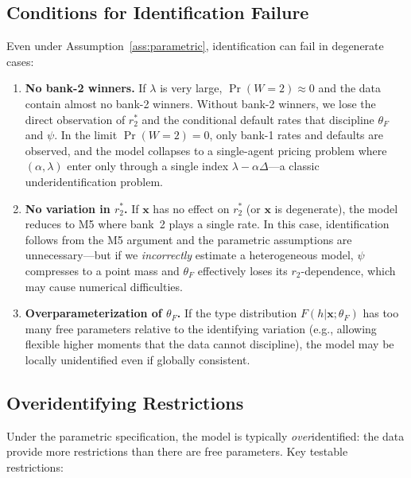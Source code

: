 \documentclass[12pt]{article}
\theoremstyle{plain}
\theoremstyle{plain}
\theoremstyle{definition}  %
\theoremstyle{remark}  %
\begin{document}
\subsection{Conditions for Identification Failure}\label{sec:failure}

Even under Assumption~\ref{ass:parametric}, identification can fail in degenerate cases:

\begin{enumerate}
    \item \textbf{No bank-2 winners.} If $\lambda$ is very large, $\Pr(W\!=\!2) \approx 0$ and the data contain almost no bank-2 winners.  Without bank-2 winners, we lose the direct observation of $r_2^*$ and the conditional default rates that discipline $\theta_F$ and $\psi$.  In the limit $\Pr(W\!=\!2) = 0$, only bank-1 rates and defaults are observed, and the model collapses to a single-agent pricing problem where $(\alpha, \lambda)$ enter only through a single index $\lambda - \alpha\Delta$---a classic underidentification problem.
    
    \item \textbf{No variation in $r_2^*$.} If $\mathbf{x}$ has no effect on $r_2^*$ (or $\mathbf{x}$ is degenerate), the model reduces to M5 where bank~2 plays a single rate.  In this case, identification follows from the M5 argument and the parametric assumptions are unnecessary---but if we \emph{incorrectly} estimate a heterogeneous model, $\psi$ compresses to a point mass and $\theta_F$ effectively loses its $r_2$-dependence, which may cause numerical difficulties.
    
    \item \textbf{Overparameterization of $\theta_F$.} If the type distribution $F(h|\mathbf{x};\theta_F)$ has too many free parameters relative to the identifying variation (e.g., allowing flexible higher moments that the data cannot discipline), the model may be locally unidentified even if globally consistent.
\end{enumerate}

\subsection{Overidentifying Restrictions}\label{sec:overid}

Under the parametric specification, the model is typically \emph{over}identified: the data provide more restrictions than there are free parameters.  Key testable restrictions:
\end{document}
